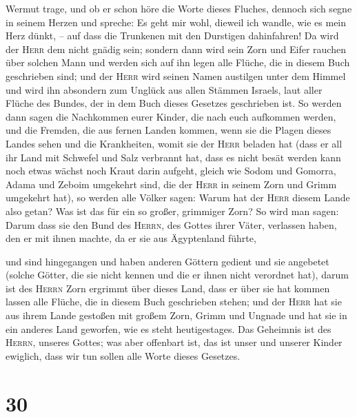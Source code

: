 Wermut trage,  und ob er schon höre die Worte dieses
Fluches, dennoch sich segne in seinem Herzen und spreche: Es geht mir
wohl, dieweil ich wandle, wie es mein Herz dünkt, -- auf dass die
Trunkenen mit den Durstigen dahinfahren!  Da wird der
\textsc{Herr} dem nicht gnädig sein; sondern dann wird sein Zorn und
Eifer rauchen über solchen Mann und werden sich auf ihn legen alle
Flüche, die in diesem Buch geschrieben sind; und der \textsc{Herr} wird
seinen Namen austilgen unter dem Himmel  und wird ihn
absondern zum Unglück aus allen Stämmen Israels, laut aller Flüche des
Bundes, der in dem Buch dieses Gesetzes geschrieben ist. 
So werden dann sagen die Nachkommen eurer Kinder, die nach euch
aufkommen werden, und die Fremden, die aus fernen Landen kommen, wenn
sie die Plagen dieses Landes sehen und die Krankheiten, womit sie der
\textsc{Herr} beladen hat  (dass er all ihr Land mit
Schwefel und Salz verbrannt hat, dass es nicht besät werden kann noch
etwas wächst noch Kraut darin aufgeht, gleich wie Sodom und Gomorra,
Adama und Zeboim umgekehrt sind, die der \textsc{Herr} in seinem Zorn
und Grimm umgekehrt hat),  so werden alle Völker sagen:
Warum hat der \textsc{Herr} diesem Lande also getan? Was ist das für ein
so großer, grimmiger Zorn?  So wird man sagen: Darum dass
sie den Bund des \textsc{Herrn}, des Gottes ihrer Väter, verlassen
haben, den er mit ihnen machte, da er sie aus Ägyptenland führte,

 und sind hingegangen und haben anderen Göttern gedient
und sie angebetet (solche Götter, die sie nicht kennen und die er ihnen
nicht verordnet hat),  darum ist des \textsc{Herrn} Zorn
ergrimmt über dieses Land, dass er über sie hat kommen lassen alle
Flüche, die in diesem Buch geschrieben stehen;  und der
\textsc{Herr} hat sie aus ihrem Lande gestoßen mit großem Zorn, Grimm
und Ungnade und hat sie in ein anderes Land geworfen, wie es steht
heutigestages.  Das Geheimnis ist des \textsc{Herrn},
unseres Gottes; was aber offenbart ist, das ist unser und unserer Kinder
ewiglich, dass wir tun sollen alle Worte dieses Gesetzes.

\hypertarget{section-29}{%
\section{30}\label{section-29}}

